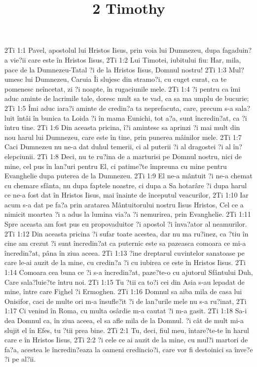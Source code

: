 

\title{2 Timothy}

2Ti 1:1  Pavel, apostolul lui Hristos Iisus, prin voia lui Dumnezeu, dupa fagaduin?a vie?ii care este în Hristos Iisus,
2Ti 1:2  Lui Timotei, iubitului fiu: Har, mila, pace de la Dumnezeu-Tatal ?i de la Hristos Iisus, Domnul nostru!
2Ti 1:3  Mul?umesc lui Dumnezeu, Caruia Îi slujesc din stramo?i, cu cuget curat, ca te pomenesc neîncetat, zi ?i noapte, în rugaciunile mele.
2Ti 1:4  ?i pentru ca îmi aduc aminte de lacrimile tale, doresc mult sa te vad, ca sa ma umplu de bucurie;
2Ti 1:5  Îmi aduc iara?i aminte de credin?a ta neprefacuta, care, precum s-a sala?luit întâi în bunica ta Loida ?i în mama Eunichi, tot a?a, sunt încredin?at, ca ?i întru tine.
2Ti 1:6  Din aceasta pricina, î?i amintesc sa aprinzi ?i mai mult din nou harul lui Dumnezeu, care este în tine, prin punerea mâinilor mele.
2Ti 1:7  Caci Dumnezeu nu ne-a dat duhul temerii, ci al puterii ?i al dragostei ?i al în?elepciunii.
2Ti 1:8  Deci, nu te ru?ina de a marturisi pe Domnul nostru, nici de mine, cel pus în lan?uri pentru El, ci patime?te împreuna cu mine pentru Evanghelie dupa puterea de la Dumnezeu.
2Ti 1:9  El ne-a mântuit ?i ne-a chemat cu chemare sfânta, nu dupa faptele noastre, ci dupa a Sa hotarâre ?i dupa harul ce ne-a fost dat în Hristos Iisus, mai înainte de începutul veacurilor,
2Ti 1:10  Iar acum s-a dat pe fa?a prin aratarea Mântuitorului nostru Iisus Hristos, Cel ce a nimicit moartea ?i a adus la lumina via?a ?i nemurirea, prin Evanghelie.
2Ti 1:11  Spre aceasta am fost pus eu propovaduitor ?i apostol ?i înva?ator al neamurilor.
2Ti 1:12  Din aceasta pricina ?i sufar toate acestea, dar nu ma ru?inez, ca ?tiu în cine am crezut ?i sunt încredin?at ca puternic este sa pazeasca comoara ce mi-a încredin?at, pâna în ziua aceea.
2Ti 1:13  ?ine dreptarul cuvintelor sanatoase pe care le-ai auzit de la mine, cu credin?a ?i cu iubirea ce este în Hristos Iisus.
2Ti 1:14  Comoara cea buna ce ?i s-a încredin?at, paze?te-o cu ajutorul Sfântului Duh, Care sala?luie?te întru noi.
2Ti 1:15  Tu ?tii ca to?i cei din Asia s-au lepadat de mine, între care Fighel ?i Ermoghen.
2Ti 1:16  Domnul sa aiba mila de casa lui Onisifor, caci de multe ori m-a însufle?it ?i de lan?urile mele nu s-a ru?inat,
2Ti 1:17  Ci venind în Roma, cu multa osârdie m-a cautat ?i m-a gasit.
2Ti 1:18  Sa-i dea Domnul ca, în ziua aceea, el sa afle mila de la Domnul. ?i cât de mult mi-a slujit el în Efes, tu ?tii prea bine.
2Ti 2:1  Tu, deci, fiul meu, întare?te-te în harul care e în Hristos Iisus,
2Ti 2:2  ?i cele ce ai auzit de la mine, cu mul?i martori de fa?a, acestea le încredin?eaza la oameni credincio?i, care vor fi destoinici sa înve?e ?i pe al?ii.
